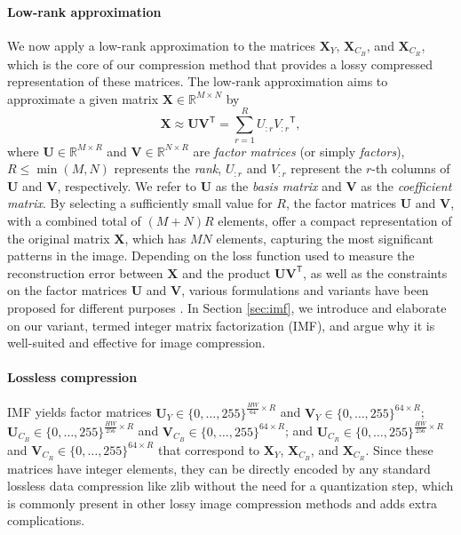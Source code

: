 \paragraph{Low-rank approximation}
We now apply a low-rank approximation to the matrices $\bm{X}_{Y}$, $\bm{X}_{C_B}$, and $\bm{X}_{C_R}$, which is the core of our compression method that provides a lossy compressed representation of these matrices.  The low-rank approximation \cite{eckart1936approximation} aims to approximate a given matrix $ \bm{X} \in \mathbb{R}^{M \times N} $ by
\begin{equation} \label{eq:lra}
    \bm{X} \approx \bm{U} \bm{V}^\mathsf{T} = \sum_{r=1}^{R} U_{:r} {V_{:r}}^\mathsf{T},
\end{equation}
where $\bm{U} \in \mathbb{R}^{M \times R}$ and $\bm{V} \in \mathbb{R}^{N \times R}$ are \emph{factor matrices} (or simply \emph{factors}), $R \leq \min(M,N)$ represents the \emph{rank}, $U_{:r}$ and $V_{:r}$ represent the $r$-th columns of $\bm{U}$ and $\bm{V}$, respectively. We refer to $\bm{U}$ as the \emph{basis matrix} and $\bm{V}$ as the \emph{coefficient matrix}. By selecting a sufficiently small value for $R$, the factor matrices $\bm{U}$ and $\bm{V}$, with a combined total of $(M+N)R$ elements, offer a compact representation of the original matrix $\bm{X}$, which has $MN$ elements, capturing the most significant patterns in the image. Depending on the loss function used to measure the reconstruction error between $\bm{X}$ and the product $\bm{U} \bm{V}^\mathsf{T}$, as well as the constraints on the factor matrices $\bm{U}$ and $\bm{V}$, various formulations and variants have been proposed for different purposes \cite{lee2000algorithms, ding2008convex, lin2005integer}. In Section \ref{sec:imf}, we introduce and elaborate on our variant, termed integer matrix factorization (IMF), and argue why it is well-suited and effective for image compression.


\paragraph{Lossless compression}
IMF yields factor matrices $\bm{U}_{Y} \in \{0, \ldots, 255\}^{\frac{HW}{64} \times R}$ and $\bm{V}_{Y} \in \{0, \ldots, 255\}^{64 \times R}$; $\bm{U}_{C_B} \in \{0, \ldots, 255\}^{\frac{HW}{256} \times R}$ and $\bm{V}_{C_B} \in \{0, \ldots, 255\}^{64 \times R}$; and $\bm{U}_{C_R} \in \{0, \ldots, 255\}^{\frac{HW}{256} \times R}$ and $\bm{V}_{C_R} \in \{0, \ldots, 255\}^{64 \times R}$ that correspond to $\bm{X}_{Y}$, $\bm{X}_{C_B}$, and $\bm{X}_{C_R}$. Since these matrices have integer elements, they can be directly encoded by any standard lossless data compression like zlib \cite{deutsch1996zlib} without the need for a quantization step, which is commonly present in other lossy image compression methods and adds extra complications.

